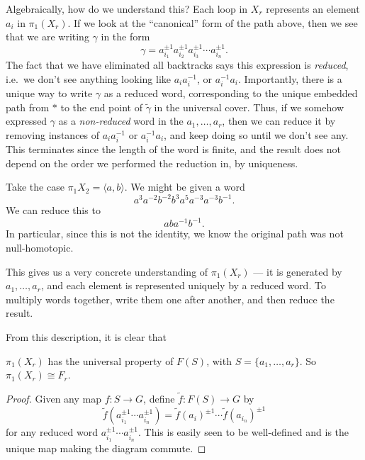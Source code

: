 \documentclass[a4paper]{article}
\begin{document}
Algebraically, how do we understand this? Each loop in $X_r$ represents an element $a_i$ in $\pi_1(X_r)$. If we look at the ``canonical'' form of the path above, then we see that we are writing $\gamma$ in the form
\[
  \gamma = a_{i_1}^{\pm 1} a_{i_2}^{\pm 1} a_{i_3}^{\pm 1}\cdots a_{i_n}^{\pm 1}.
\]
The fact that we have eliminated all backtracks says this expression is \emph{reduced}, i.e.\ we don't see anything looking like $a_i a_i^{-1}$, or $a_i^{-1} a_i$. Importantly, there is a unique way to write $\gamma$ as a reduced word, corresponding to the unique embedded path from $*$ to the end point of $\tilde{\gamma}$ in the universal cover. Thus, if we somehow expressed $\gamma$ as a \emph{non-reduced} word in the $a_1, \ldots, a_r$, then we can reduce it by removing instances of $a_i a_i^{-1}$ or $a_i^{-1} a_i$, and keep doing so until we don't see any. This terminates since the length of the word is finite, and the result does not depend on the order we performed the reduction in, by uniqueness.

\begin{eg}
  Take the case $\pi_1 X_2 = \langle a, b\rangle$. We might be given a word
  \[
    a^3 a^{-2} b^{-2} b^3 a^5 a^{-3} a^{-3} b^{-1}.
  \]
  We can reduce this to
  \[
    a ba^{-1}b^{-1}.
  \]
  In particular, since this is not the identity, we know the original path was not null-homotopic.
\end{eg}

This gives us a very concrete understanding of $\pi_1(X_r)$ --- it is generated by $a_1, \ldots, a_r$, and each element is represented uniquely by a reduced word. To multiply words together, write them one after another, and then reduce the result.

From this description, it is clear that
\begin{cor}
  $\pi_1(X_r)$ has the universal property of $F(S)$, with $S = \{a_1, \ldots, a_r\}$. So $\pi_1(X_r) \cong F_r$.
\end{cor}

\begin{proof}
  Given any map $f: S \to G$, define $\tilde{f}: F(S) \to G$ by
  \[
    \tilde{f}(a_{i_1}^{\pm 1}\cdots a_{i_n}^{\pm 1}) = \tilde{f}(a_i)^{\pm 1} \cdots \tilde{f}(a_{i_n})^{\pm 1}
  \]
  for any reduced word $a_{i_1}^{\pm 1} \cdots a_{i_n}^{\pm 1}$. This is easily seen to be well-defined and is the unique map making the diagram commute.
\end{proof}
\end{document}
